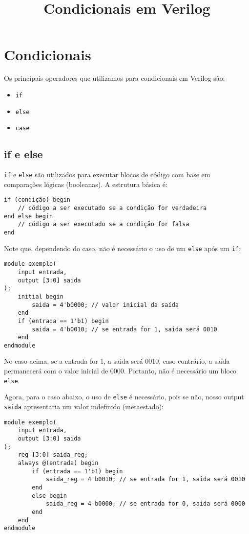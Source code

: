 \documentclass{article}
\title{Condicionais em Verilog}
\date{}
\begin{document}
\maketitle

\section*{Condicionais}

Os principais operadores que utilizamos para condicionais em Verilog são:

\begin{itemize}
  \item \texttt{if} 
  \item \texttt{else}
  \item \texttt{case}
\end{itemize}

\subsection*{if e else}

\texttt{if} e \texttt{else} são utilizados para executar blocos de código com base em comparações lógicas (booleanas). A estrutura básica é:

\begin{lstlisting}
if (condição) begin
    // código a ser executado se a condição for verdadeira
end else begin
    // código a ser executado se a condição for falsa
end
\end{lstlisting}

Note que, dependendo do caso, não é necessário o uso de um \texttt{else} após um \texttt{if}:

\begin{lstlisting}
module exemplo(
    input entrada,
    output [3:0] saida 
);
    initial begin
        saida = 4'b0000; // valor inicial da saída
    end
    if (entrada == 1'b1) begin
        saida = 4'b0010; // se entrada for 1, saida será 0010
    end
endmodule
\end{lstlisting}

No caso acima, se a entrada for 1, a saída será 0010, caso contrário, a saída permanecerá com o valor inicial de 0000. Portanto, não é necessário um bloco \texttt{else}.

Agora, para o caso abaixo, o uso de \texttt{else} é necessário, pois se não, nosso output \texttt{saida} apresentaria um valor indefinido (metaestado):

\begin{lstlisting}
module exemplo(
    input entrada,
    output [3:0] saida 
);
    reg [3:0] saida_reg;
    always @(entrada) begin
        if (entrada == 1'b1) begin
            saida_reg = 4'b0010; // se entrada for 1, saida será 0010
        end
        else begin
            saida_reg = 4'b0000; // se entrada for 0, saida será 0000
        end
    end
endmodule
\end{lstlisting}
\end{document}
